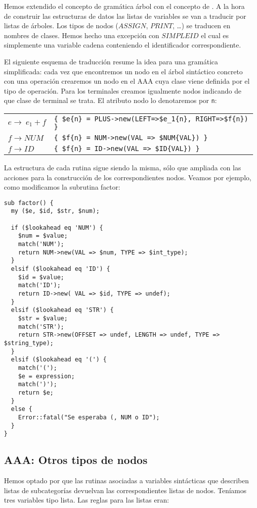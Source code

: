 Hemos extendido el concepto de gramática 
árbol con el concepto de . 
A la hora de construir las estructuras de datos
las listas de variables se van a traducir por listas de árboles.
Los tipos de nodos ($ASSIGN$, $PRINT$, \ldots )
se traducen en nombres de clases. Hemos hecho
una excepción con $SIMPLEID$ el cual es simplemente una 
variable cadena conteniendo el identificador correspondiente.

El siguiente esquema de traducción resume la idea para una gramática 
simplificada: cada vez que encontremos un nodo en el árbol sintáctico 
concreto con una operación crearemos un nodo en el AAA cuya clase
viene definida por el tipo de operación. Para los terminales
creamos igualmente nodos indicando de que clase de terminal 
se trata. El atributo nodo lo denotaremos por \verb|n|:

\vspace{0.25cm}
\begin{tabular}{ll}
$e   \rightarrow\ e_1 + f$  & \verb|{ $e{n} = PLUS->new(LEFT=>$e_1{n}, RIGHT=>$f{n}) }| \\
$f   \rightarrow NUM$       & \verb|{ $f{n} = NUM->new(VAL => $NUM{VAL}) }|\\
$f   \rightarrow ID$        & \verb|{ $f{n} = ID->new(VAL => $ID{VAL}) }|
\end{tabular}
\vspace{0.5cm}

La estructura de cada rutina sigue siendo la misma, 
sólo que ampliada con las acciones para la construcción de los
correspondientes nodos. Veamos por ejemplo, como modificamos
la subrutina factor:

\begin{verbatim}
sub factor() {
  my ($e, $id, $str, $num);

  if ($lookahead eq 'NUM') {
    $num = $value;
    match('NUM');
    return NUM->new(VAL => $num, TYPE => $int_type);
  }
  elsif ($lookahead eq 'ID') {
    $id = $value;
    match('ID');
    return ID->new( VAL => $id, TYPE => undef);
  }
  elsif ($lookahead eq 'STR') {
    $str = $value;
    match('STR');
    return STR->new(OFFSET => undef, LENGTH => undef, TYPE => $string_type);
  }
  elsif ($lookahead eq '(') {
    match('(');
    $e = expression;
    match(')');
    return $e;
  }
  else {
    Error::fatal("Se esperaba (, NUM o ID");
  }
}
\end{verbatim}

\subsection{AAA: Otros tipos de nodos}
Hemos optado por que las rutinas asociadas a variables sintácticas que 
describen listas de subcategorías devuelvan 
las correspondientes listas de nodos. Teníamos tres variables tipo lista.
Las reglas para las listas eran:

